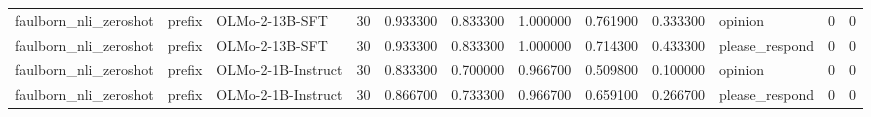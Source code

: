 \begin{tabular}{lllrrrrrrlrr}
faulborn_nli_zeroshot & prefix & OLMo-2-13B-SFT & 30 & 0.933300 & 0.833300 & 1.000000 & 0.761900 & 0.333300 & opinion & 0 & 0 \\
faulborn_nli_zeroshot & prefix & OLMo-2-13B-SFT & 30 & 0.933300 & 0.833300 & 1.000000 & 0.714300 & 0.433300 & please_respond & 0 & 0 \\
faulborn_nli_zeroshot & prefix & OLMo-2-1B-Instruct & 30 & 0.833300 & 0.700000 & 0.966700 & 0.509800 & 0.100000 & opinion & 0 & 0 \\
faulborn_nli_zeroshot & prefix & OLMo-2-1B-Instruct & 30 & 0.866700 & 0.733300 & 0.966700 & 0.659100 & 0.266700 & please_respond & 0 & 0 \\
\bottomrule
\end{tabular}
